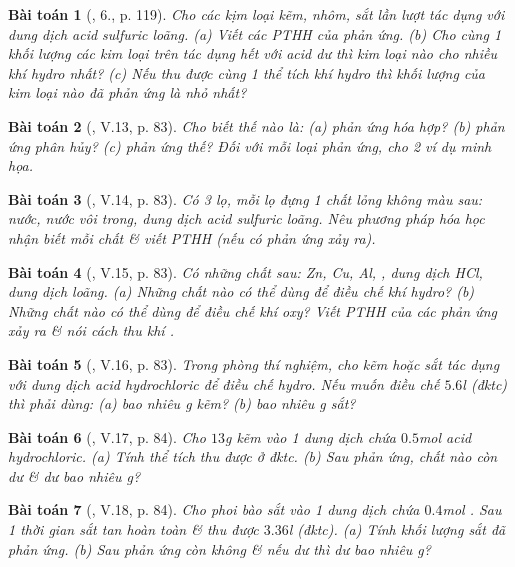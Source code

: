 \documentclass{article}
\newtheorem{baitoan}{Bài toán}
\begin{document}
\begin{baitoan}[\cite{SGK_Hoa_Hoc_8}, 6., p. 119]
	Cho các kịm loại kẽm, nhôm, sắt lần lượt tác dụng với dung dịch acid sulfuric loãng. (a) Viết các PTHH của phản ứng. (b) Cho cùng 1 khối lượng các kim loại trên tác dụng hết với acid dư thì kim loại nào cho nhiều khí hydro nhất? (c) Nếu thu được cùng 1 thể tích khí hydro thì khối lượng của kim loại nào đã phản ứng là nhỏ nhất?
\end{baitoan}

\begin{baitoan}[\cite{Truong_BTNC_Hoa_Hoc_8_2022}, V.13, p. 83]
	Cho biết thế nào là: (a) phản ứng hóa hợp? (b) phản ứng phân hủy? (c) phản ứng thế? Đối với mỗi loại phản ứng, cho 2 ví dụ minh họa.
\end{baitoan}

\begin{baitoan}[\cite{Truong_BTNC_Hoa_Hoc_8_2022}, V.14, p. 83]
	Có 3 lọ, mỗi lọ đựng 1 chất lỏng không màu sau: nước, nước vôi trong, dung dịch acid sulfuric loãng. Nêu phương pháp hóa học nhận biết mỗi chất \& viết PTHH (nếu có phản ứng xảy ra).
\end{baitoan}

\begin{baitoan}[\cite{Truong_BTNC_Hoa_Hoc_8_2022}, V.15, p. 83]
	Có những chất sau: \emph{Zn, Cu, Al, }, dung dịch \emph{HCl}, dung dịch \emph{} loãng. (a) Những chất nào có thể dùng để điều chế khí hydro? (b) Những chất nào có thể dùng để điều chế khí oxy? Viết PTHH của các phản ứng xảy ra \& nói cách thu khí \emph{}.
\end{baitoan}

\begin{baitoan}[\cite{Truong_BTNC_Hoa_Hoc_8_2022}, V.16, p. 83]
	Trong phòng thí nghiệm, cho kẽm hoặc sắt tác dụng với dung dịch acid hydrochloric để điều chế hydro. Nếu muốn điều chế $5.6$\emph{l } (đktc) thì phải dùng: (a) bao nhiêu \emph{g} kẽm? (b) bao nhiêu \emph{g} sắt?
\end{baitoan}

\begin{baitoan}[\cite{Truong_BTNC_Hoa_Hoc_8_2022}, V.17, p. 84]
	Cho $13$\emph{g} kẽm vào 1 dung dịch chứa $0.5$\emph{mol} acid hydrochloric. (a) Tính thể tích \emph{} thu được ở đktc. (b) Sau phản ứng, chất nào còn dư \& dư bao nhiêu \emph{g}?
\end{baitoan}

\begin{baitoan}[\cite{Truong_BTNC_Hoa_Hoc_8_2022}, V.18, p. 84]
	Cho phoi bào sắt vào 1 dung dịch chứa $0.4$\emph{mol }. Sau 1 thời gian sắt tan hoàn toàn \& thu được $3.36$\emph{l } (đktc). (a) Tính khối lượng sắt đã phản ứng. (b) Sau phản ứng còn \emph{} không \& nếu dư thì dư bao nhiêu \emph{g}?
\end{baitoan}
\end{document}
